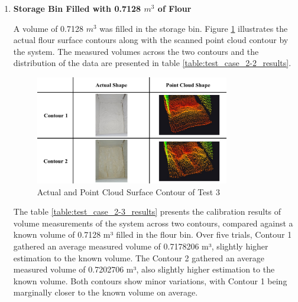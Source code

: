 \begin{enumerate}

	\item \textbf{Storage Bin Filled with 0.7128 $m^3$ of Flour}

	      A volume of 0.7128 $m^3$ was filled in the storage bin. Figure \ref{ch4:fig:test_2-3_contours} illustrates the actual flour surface contours along with the scanned point cloud contour by the system. The measured volumes across the two contours and the distribution of the data are presented in table \ref{table:test_case_2-2_results}.%
	      \\
	      \begin{figure}[H]
		      \centering
		      \includegraphics[width=0.8\textwidth]{Figures/test_2-3_contours}
		      \caption{Actual and Point Cloud Surface Contour of Test 3}
		      \label{ch4:fig:test_2-3_contours}
	      \end{figure}

	      The table \ref{table:test_case_2-3_results} presents the calibration results of volume measurements of the system across two contours, compared against a known volume of 0.7128 m³ filled in the flour bin. Over five trials, Contour 1 gathered an average measured volume of 0.7178206 m³, slightly higher estimation to the known volume. The Contour 2 gathered an average measured volume of 0.7202706 m³, also slightly higher estimation to the known volume. Both contours show minor variations, with Contour 1 being marginally closer to the known volume on average. \\


\end{enumerate}
